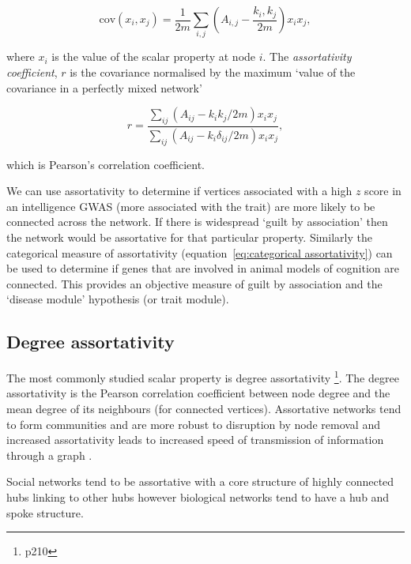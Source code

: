 \begin{equation}
   \textrm{cov}(x_i,x_j)  = \frac{1}{2m}\sum_{i,j}(A_{i,j}-\frac{k_i,k_j}{2m})x_ix_j,
   \label{eq:assortativity covariance of xi and xj over edges}
\end{equation}

where $x_i$ is the value of the scalar property at node $i$. The \textit{assortativity coefficient}, $r$ is the covariance normalised by the maximum `value of the covariance in a perfectly mixed network'\cite{newman2018networks}

 \begin{equation}
     r = \frac{\sum_{ij}(A_{ij}-k_ik_j/2m)x_ix_j}{\sum_{ij}(A_{ij}-k_i\delta_{ij}/2m)x_ix_j},
 \end{equation}
 
 which is Pearson's correlation coefficient\cite{newman2018networks}.
 
We can use assortativity to determine if vertices associated with a high $z$ score in an intelligence GWAS (more associated with the trait) are more likely to be connected across the network. If there is widespread `guilt by association'\cite{oliver2000guilt} then the network would be assortative for that particular property. Similarly the categorical measure of assortativity (equation~\ref{eq:categorical assortativity}) can be used to determine if genes that are involved in animal models of cognition are connected. This provides an objective measure of guilt by association and the `disease module'\cite{baranzini2013network} hypothesis (or trait module).

\subsection{Degree assortativity}
\label{sec:degree assortativity}

The most commonly studied scalar property is degree assortativity \cite{newman2018networks}\footnote{p210}. The degree assortativity is the Pearson correlation coefficient between node degree and the mean degree of its neighbours (for connected vertices)\cite{noldus2015assortativity}. Assortative networks tend to form communities and are more robust to disruption by node removal \cite{newman2002assortative} and increased assortativity leads to increased speed of transmission of information through a graph \cite{noldus2015assortativity}.

Social networks tend to be assortative with a core structure of highly connected hubs linking to other hubs\cite{newman2018networks} however biological networks tend to have a hub and spoke structure.  



